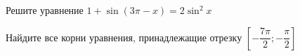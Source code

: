 \begin{ex}
	\begin{condition}
		\begin{enumcols}[label=\asbuk*)]
			\item Решите уравнение \( 1 + \sin {(3\pi - x)} = 2\sin^2 x \)
			\item Найдите все корни уравнения, принадлежащие отрезку \( \left[-\dfrac{7\pi}{2};-\dfrac{\pi}{2}\right] \)
		\end{enumcols}
	\end{condition}
\end{ex}